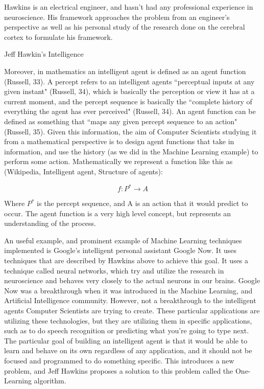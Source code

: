 \documentclass[11pt, oneside]{article}
\begin{document}
\par Hawkins is an electrical engineer, and hasn't had any professional experience in neuroscience. His framework approaches the problem from an engineer's perspective as well as his personal study of the research done on the cerebral cortex to formulate his framework.

\par Jeff Hawkin's Intelligence

\par Moreover, in mathematics an intelligent agent is defined as an agent function (Russell, 33). A percept refers to an intelligent agents ``perceptual inputs at any given instant" (Russell, 34), which is basically the perception or view it has at a current moment, and the percept sequence is basically the ``complete history of everything the agent has ever perceived" (Russell, 34). An agent function can be defined as something that ``maps any given percept sequence to an action" (Russell, 35). Given this information, the aim of Computer Scientists studying it from a mathematical perspective is to design agent functions that take in information, and use the history (as we did in the Machine Learning example) to perform some action. Mathematically we represent a function like this as (Wikipedia, Intelligent agent, Structure of agents):

\begin{equation} \label{eu_eqn}
f\colon P^* \to A
\end{equation}

\noindent Where $P^*$ is the percept sequence, and A is an action that it would predict to occur. The agent function is a very high level concept, but represents an understanding of the process. 


\par An useful example, and prominent example of Machine Learning techniques implemented is Google's intelligent personal assistant Google Now. It uses techniques that are described by Hawkins above to achieve this goal. It uses a technique called neural networks, which try and utilize the research in neuroscience and behaves very closely to the actual neurons in our brains. Google Now was a breakthrough when it was introduced in the Machine Learning, and Artificial Intelligence community. However, not a breakthrough to the intelligent agents Computer Scientists are trying to create. These particular applications are utilizing these technologies, but they are utilizing them in specific applications, such as to do speech recognition or predicting what you're going to type next. The particular goal of building an intelligent agent is that it would be able to learn and behave on its own regardless of any application, and it should not be focused and programmed to do something specific. This introduces a new problem, and Jeff Hawkins proposes a solution to this problem called the One-Learning algorithm.
\end{document}
